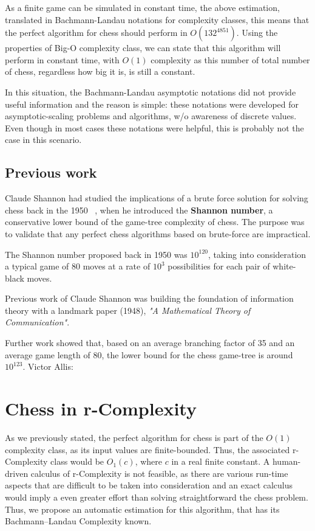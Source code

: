 As a finite game can be simulated in constant time, the above estimation, translated in Bachmann-Landau notations for complexity classes, this means that the perfect algorithm for chess should perform in $O(132^{4851})$. Using the properties of Big-O complexity class, we can state that this algorithm will perform in constant time, with $O(1)$ complexity as this number of total number of chess, regardless how big it is, is still a constant. 

In this situation, the Bachmann-Landau asymptotic notations did not provide useful information and the reason is simple: these notations were developed for asymptotic-scaling problems and algorithms, w/o awareness of discrete values. Even though in most cases these notations were helpful, this is probably not the case in this scenario.

\subsection{Previous work}
Claude Shannon had studied the implications of a brute force solution for solving chess back in the 1950 ~\cite{shannon1950xxii}, when he introduced the \textbf{Shannon number}, a conservative lower bound of the game-tree complexity of chess. The purpose was to validate that any perfect chess algorithms based on brute-force are impractical.

The Shannon number proposed back in 1950 was $10^{120}$, taking into consideration a typical game  of 80 moves at a rate of $10^3$ possibilities for each pair of white-black moves.

Previous work of Claude Shannon was building the foundation of information theory with a landmark paper (1948), \textit{"A Mathematical Theory of Communication"}. 

Further work showed that, based on an average branching factor of 35 and an average game length of 80, the lower bound for the chess game-tree is around $10^{123}$. Victor Allis: ~\cite{allis1994searching}

\section{Chess in r-Complexity}
As we previously stated, the perfect algorithm for chess is part of the $O(1)$ complexity class, as its input values are finite-bounded. Thus, the associated r-Complexity class would be $O_{1}(c)$, where $c$ in a real finite constant. A human-driven calculus of r-Complexity is not feasible, as there are various run-time aspects that are difficult to be taken into consideration and an exact calculus would imply a even greater effort than solving straightforward the chess problem. Thus, we propose an automatic estimation for this algorithm, that has its Bachmann–Landau Complexity known.

